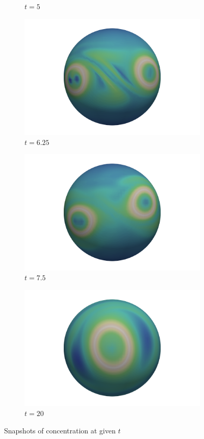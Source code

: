 \documentclass{article}
\begin{document}
\begin{figure}[h]
\begin{subfigure}[b]{0.15\textwidth}
		\caption{$t=5$}
	\end{subfigure}
	\begin{subfigure}[b]{0.15\textwidth}
		\includegraphics[scale=0.1]{images/w625.png}
		\caption{$t=6.25$}
	\end{subfigure}
	\begin{subfigure}[b]{0.15\textwidth}
		\includegraphics[scale=0.1]{images/w75.png}
		\caption{$t=7.5$}
	\end{subfigure}
	\begin{subfigure}[b]{0.15\textwidth}
		\includegraphics[scale=0.1]{images/w20.png}
		\caption{$t=20$}
	\end{subfigure}
	\caption{Snapshots of concentration at given $t$}
\end{figure}
\end{document}
